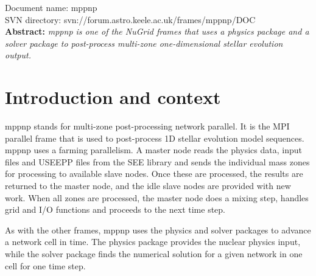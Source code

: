 \renewcommand{\ndoctitle}{MPPNP: The multi-zone parallel frame} 
\renewcommand{\ndocname}{mppnp}                      
\renewcommand{\svndir}{svn://forum.astro.keele.ac.uk/frames/mppnp/DOC}  
\renewcommand{\ndoccontribs}{FH, RH, PD}



Document name: \ndocname \\
SVN directory: \svndir\\

{  \textbf{Abstract:} \slshape
mppnp is one of the NuGrid frames that uses a physics package and a solver package to post-process multi-zone one-dimensional stellar evolution output.  
}





\section{Introduction and context}
 mppnp stands for multi-zone post-processing network
parallel. It is the MPI parallel frame that is used to post-process 1D
stellar evolution model sequences. mppnp uses a farming parallelism. A
master node reads the physics data, input files and USEEPP
files from the SEE library  and sends the
individual mass zones for processing to available slave
nodes. Once these are processed, the results are returned to the master
node, and the idle slave nodes are provided with new work. When all
zones are processed, the master node does a mixing step, handles
grid and I/O functions and proceeds to the next time step.

As with the other frames, mppnp uses the physics and solver
packages to advance a network cell in time. The physics package
provides the nuclear physics input, while the solver package finds the
numerical solution for a given network in one cell for one time step.

